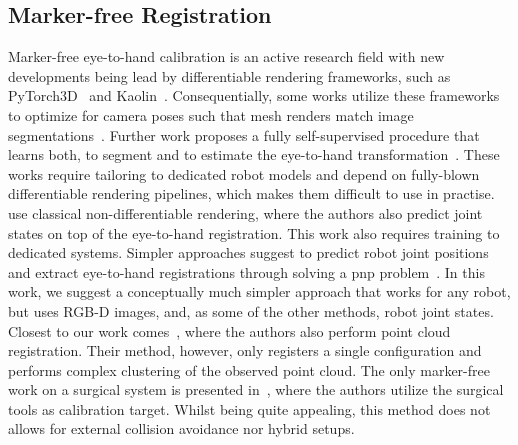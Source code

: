 \subsection{Marker-free Registration}
Marker-free eye-to-hand calibration is an active research field with new developments being lead by differentiable rendering frameworks, such as PyTorch3D~\cite{ravi2020pytorch3d} and Kaolin~\cite{KaolinLibrary}. Consequentially, some works utilize these frameworks to optimize for camera poses such that mesh renders match image segmentations~\cite{Chen:RAL:2023}. Further work proposes a fully self-supervised procedure that learns both, to segment and to estimate the eye-to-hand transformation~\cite{lu2023markerless}. These works require tailoring to dedicated robot models and depend on fully-blown differentiable rendering pipelines, which makes them difficult to use in practise.
~\citet{labbe2021single} use classical non-differentiable rendering, where the authors also predict joint states on top of the eye-to-hand registration. This work also requires training to dedicated systems. Simpler approaches suggest to predict robot joint positions and extract eye-to-hand registrations through solving a \gls{pnp} problem~\cite{lee2020camera}. In this work, we suggest a conceptually much simpler approach that works for any robot, but uses RGB-D images, and, as some of the other methods, robot joint states. Closest to our work comes~\cite{point_cloud_based_robot_cell_calib}, where the authors also perform point cloud registration. Their method, however, only registers a single configuration and performs complex clustering of the observed point cloud. The only marker-free work on a surgical system is presented in~\cite{hand_eye_calibration_robotic_assisted}, where the authors utilize the surgical tools as calibration target. Whilst being quite appealing, this method does not allows for external collision avoidance nor hybrid setups.



